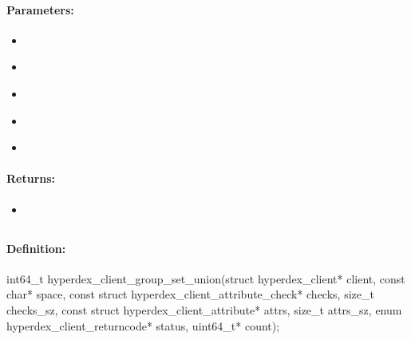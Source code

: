 \paragraph{Parameters:}
\begin{itemize}[noitemsep]
\item {}\\

\item {}\\

\item {}\\

\item {}\\

\item {}\\

\end{itemize}

\paragraph{Returns:}
\begin{itemize}[noitemsep]
\item {}\\

\end{itemize}

\pagebreak
\subsection{}
\label{api:c:group_set_union}


\paragraph{Definition:}
\begin{ccode}
int64_t hyperdex_client_group_set_union(struct hyperdex_client* client,
        const char* space,
        const struct hyperdex_client_attribute_check* checks, size_t checks_sz,
        const struct hyperdex_client_attribute* attrs, size_t attrs_sz,
        enum hyperdex_client_returncode* status,
        uint64_t* count);
\end{ccode}

